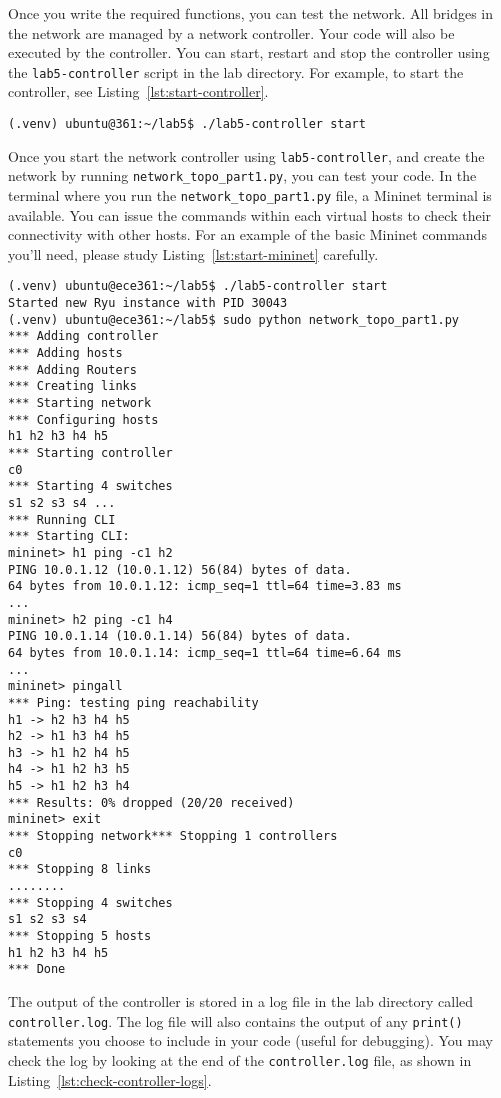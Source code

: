 \documentclass[11pt]{article}
\begin{document}
Once you write the required functions, you can test the network.
All bridges in the network are managed by a network controller. Your code will also be executed by the controller. You can start, restart and stop the controller using the \texttt{lab5-controller} script in the lab directory. For example, to start the controller, see Listing~\ref{lst:start-controller}.


\begin{lstlisting}[style=ece361shell, caption={Create the network topology for first part}, label={lst:start-controller}]
(.venv) ubuntu@361:~/lab5$ ./lab5-controller start
\end{lstlisting}

Once you start the network controller using \texttt{lab5-controller}, and create the network by running \texttt{network\_topo\_part1.py}, you can test your code.
In the terminal where you run the \texttt{network\_topo\_part1.py} file, a Mininet terminal is available. You can issue the commands within each virtual hosts to check their connectivity with other hosts. For an example of the basic Mininet commands you'll need, please study Listing~\ref{lst:start-mininet} carefully.

\begin{lstlisting}[style=ece361shell, caption={Create the network topology for first part}, label={lst:start-mininet}]
(.venv) ubuntu@ece361:~/lab5$ ./lab5-controller start
Started new Ryu instance with PID 30043
(.venv) ubuntu@ece361:~/lab5$ sudo python network_topo_part1.py
*** Adding controller
*** Adding hosts
*** Adding Routers
*** Creating links
*** Starting network
*** Configuring hosts
h1 h2 h3 h4 h5
*** Starting controller
c0
*** Starting 4 switches
s1 s2 s3 s4 ...
*** Running CLI
*** Starting CLI:
mininet> h1 ping -c1 h2
PING 10.0.1.12 (10.0.1.12) 56(84) bytes of data.
64 bytes from 10.0.1.12: icmp_seq=1 ttl=64 time=3.83 ms
...
mininet> h2 ping -c1 h4
PING 10.0.1.14 (10.0.1.14) 56(84) bytes of data.
64 bytes from 10.0.1.14: icmp_seq=1 ttl=64 time=6.64 ms
...
mininet> pingall
*** Ping: testing ping reachability
h1 -> h2 h3 h4 h5
h2 -> h1 h3 h4 h5
h3 -> h1 h2 h4 h5
h4 -> h1 h2 h3 h5
h5 -> h1 h2 h3 h4
*** Results: 0% dropped (20/20 received)
mininet> exit
*** Stopping network*** Stopping 1 controllers
c0
*** Stopping 8 links
........
*** Stopping 4 switches
s1 s2 s3 s4
*** Stopping 5 hosts
h1 h2 h3 h4 h5
*** Done
\end{lstlisting}

The output of the controller is stored in a log file in the lab directory called \texttt{controller.log}.
The log file will also contains the output of any \texttt{print()} statements you choose to include in your code (useful for debugging).
You may check the log by looking at the end of the \texttt{controller.log} file, as shown in Listing~\ref{lst:check-controller-logs}.
\end{document}

